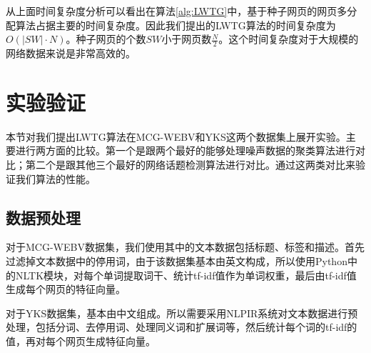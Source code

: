 从上面时间复杂度分析可以看出在算法\ref{alg:LWTG}中，基于种子网页的网页多分配算法占据主要的时间复杂度。因此我们提出的LWTG算法的时间复杂度为$O(|SW|\cdot N)$。种子网页的个数$SW$小于网页数$\frac{N}{2}$。这个时间复杂度对于大规模的网络数据来说是非常高效的。



\section{实验验证}
本节对我们提出LWTG算法在MCG-WEBV和YKS这两个数据集上展开实验。主要进行两方面的比较。第一个是跟两个最好的能够处理噪声数据的聚类算法进行对比；第二个是跟其他三个最好的网络话题检测算法进行对比。通过这两类对比来验证我们算法的性能。

\subsection{数据预处理}

对于MCG-WEBV数据集，我们使用其中的文本数据包括标题、标签和描述。首先过滤掉文本数据中的停用词，由于该数据集基本由英文构成，所以使用Python中的NLTK模块，对每个单词提取词干、统计tf-idf值作为单词权重，最后由tf-idf值生成每个网页的特征向量。

对于YKS数据集，基本由中文组成。所以需要采用NLPIR系统对文本数据进行预处理，包括分词、去停用词、处理同义词和扩展词等，然后统计每个词的tf-idf的值，再对每个网页生成特征向量。

